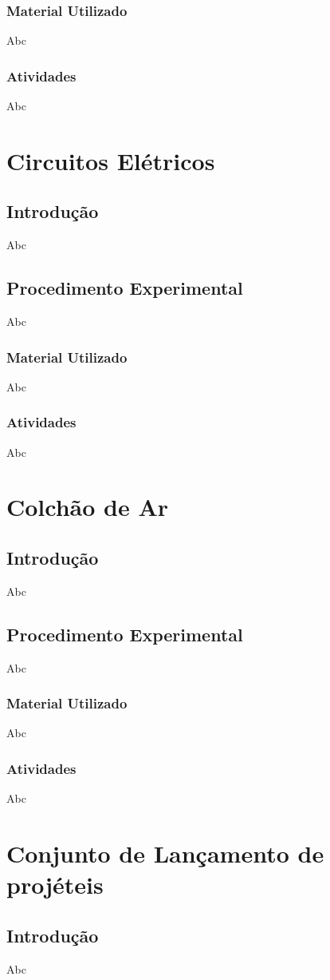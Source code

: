 \documentclass[12pt,a4paper]{article}
\begin{document}
		\subsubsection{Material Utilizado}
		Abc
		\subsubsection{Atividades}
		Abc
	\section{Circuitos Elétricos}
		\subsection{Introdução}
		Abc
		\subsection{Procedimento Experimental}
		Abc
		\subsubsection{Material Utilizado}
		Abc
		\subsubsection{Atividades}
		Abc
	\section{Colchão de Ar}
		\subsection{Introdução}
		Abc
		\subsection{Procedimento Experimental}
		Abc
		\subsubsection{Material Utilizado}
		Abc
		\subsubsection{Atividades}
		Abc
	\section{Conjunto de Lançamento de projéteis}
		\subsection{Introdução}
		Abc
\end{document}
